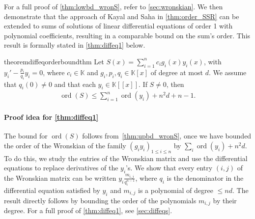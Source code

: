 \documentclass[a4paper, 11pt,dvipsnames]{article}
\newcommand{\ord}{\operatorname{ord}}
\newcommand{\BK}{\mathbb{K}}
\begin{document}

For a full proof of  \cref{thm:lowbd_wronS}, refer to \cref{sec:wronskian}. We then demonstrate that the approach of Kayal and Saha in \cref{thm:order_SSR} can be extended to sums of solutions of linear differential equations of order 1 with polynomial coefficients, resulting in a comparable bound on the sum's order. This result is formally stated in \cref{thm:diffeq1} below.
  \begin{restatable}{theorem}{diffeqorderboundthm} 
  Let $S(x) = \sum_{i=1}^n c_i g_i(x) y_i(x)$, with $y_i' - \frac{p_i}{q_i}y_i = 0 $, where $c_i \in \BK$ and $g_i, p_i, q_i \in \BK[x]$ of degree at most $d$. We assume that $q_i(0) \neq 0$ and that each $y_i \in \BK[[x]]$. If $S \neq 0$, then
  \begin{align*}
    \ord(S) \le \sum_{i=1}^n \ord(y_i) + n^2 d + n-1.  
  \end{align*} 
  \label{thm:diffeq1} 
\end{restatable}
  \paragraph{Proof idea for \cref{thm:diffeq1}} 
  The bound for $\ord(S)$ follows from~\cref{thm:upbd_wronS}, once we have bounded the order of the Wronskian of the family $(g_iy_i)_{1 \le i \le n}$ by $\sum_i \ord (y_i) + n^2d$. To do this, we study the entries of the Wronskian matrix and use the differential equations to replace derivatives of the $y_i$'s. We show that every entry $(i,j)$ of the Wronskian matrix can be written $y_i \frac{m_{i,j}}{q_i^{n-1}}$, where $q_i$ is the denominator in the differential equation satisfied by $y_i$ and $m_{i,j}$ is a polynomial of degree $\le nd$. 
  The result directly follows by bounding the order of the polynomials $m_{i,j}$ by their degree.
For a full proof of  \cref{thm:diffeq1}, see \cref{sec:diffeqs}.
\end{document}
